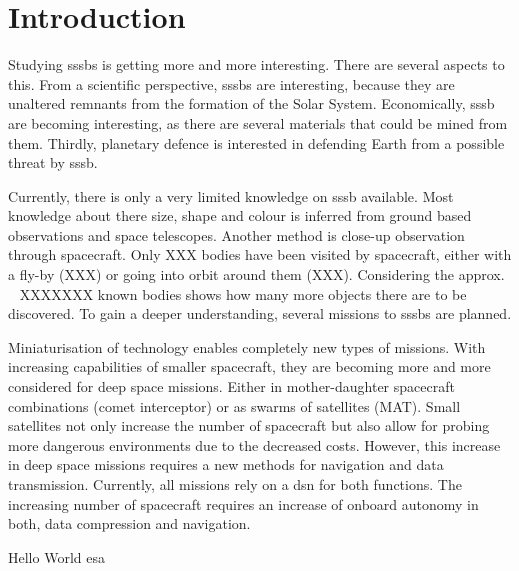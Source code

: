 \section{Introduction}
Studying \gls{sssb}s is getting more and more interesting. There are several aspects to this. From a scientific perspective, \gls{sssb}s are interesting, because they are unaltered remnants from the formation of the Solar System. Economically, \gls{sssb} are becoming interesting, as there are several materials that could be mined from them. Thirdly, planetary defence is interested in defending Earth from a possible threat by \gls{sssb}.

Currently, there is only a very limited knowledge on \gls{sssb} available. Most knowledge about there size, shape and colour is inferred from ground based observations and space telescopes. Another method is close-up observation through spacecraft. Only {\color{red}XXX} bodies have been visited by spacecraft, either with a fly-by {\color{red}(XXX)} or going into orbit around them {\color{red}(XXX)}. Considering the approx. ~{\color{red} XXXXXXX} known bodies shows how many more objects there are to be discovered. To gain a deeper understanding, several missions to \gls{sssb}s are planned. 

Miniaturisation of technology enables completely new types of missions. With increasing capabilities of smaller spacecraft, they are becoming more and more considered for deep space missions. Either in mother-daughter spacecraft combinations (comet interceptor) or as swarms of satellites (MAT). Small satellites not only increase the number of spacecraft but also allow for probing more dangerous environments due to the decreased costs. However, this increase in deep space missions requires a new methods for navigation and data transmission. Currently, all missions rely on a \gls{dsn} for both functions. The increasing number of spacecraft requires an increase of onboard autonomy in both, data compression and navigation.



Hello World \cite{Kohout2018FeasibilityStudy}
\gls{esa}